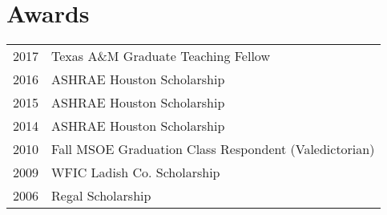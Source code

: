 \documentclass[]{deedy-resume-openfont}
\begin{document}
\begin{minipage}[t]{0.66\textwidth}



\section{Awards}

\begin{tabular}{rl}
    2017 & Texas A\&M Graduate Teaching Fellow                   \\
    2016 & ASHRAE Houston Scholarship                            \\
    2015 & ASHRAE Houston Scholarship                            \\
    2014 & ASHRAE Houston Scholarship                            \\
    2010 & Fall MSOE Graduation Class Respondent (Valedictorian) \\
    2009 & WFIC Ladish Co. Scholarship                           \\
    2006 & Regal Scholarship                                     \\
\end{tabular}




\sectionsep


\end{minipage}
\end{document}
